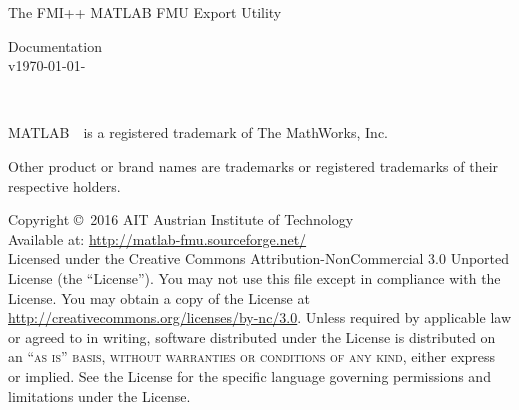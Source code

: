 \documentclass[11pt,fleqn,oneside,openany]{book} %
\newcommand{\versionsep}{-}
\newcommand{\fmipp}{FMI++\xspace}
\newcommand{\matlab}{MATLAB\xspace}
\begin{document}

\begingroup
\thispagestyle{empty}
\centering
\vspace*{9.35cm}
\par\normalfont\fontsize{29}{30}\sffamily\selectfont
The \fmipp \matlab FMU Export Utility\par %
\vspace*{0.5cm}
{\huge Documentation}\\[5pt]
{\normalsize v\yyyymmdddate\today\versionsep\currenttime}\par %
\endgroup


\newpage
~\vfill
\thispagestyle{empty}


\noindent \matlab~\textregistered~is a registered trademark of The MathWorks, Inc.

\noindent Other product or brand names are trademarks or registered trademarks of their respective holders.

\vspace*{2cm}

\noindent Copyright \copyright\ 2016 AIT Austrian Institute of Technology\\ %


\noindent Available at: \url{http://matlab-fmu.sourceforge.net/}\\ %

\noindent Licensed under the Creative Commons Attribution-NonCommercial 3.0 Unported License (the ``License''). You may not use this file except in compliance with the License. You may obtain a copy of the License at \url{http://creativecommons.org/licenses/by-nc/3.0}. Unless required by applicable law or agreed to in writing, software distributed under the License is distributed on an \textsc{``as is'' basis, without warranties or conditions of any kind}, either express or implied. See the License for the specific language governing permissions and limitations under the License.\\ %
\end{document}
